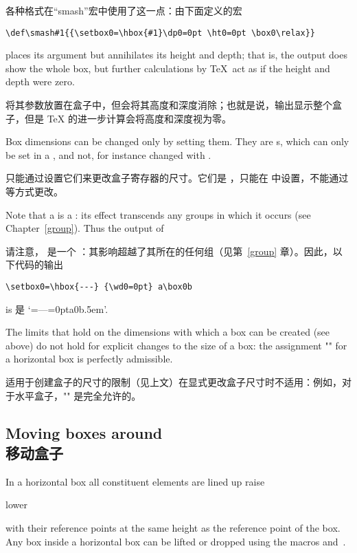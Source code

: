 各种格式在“smash”宏中使用了这一点：由下面定义的宏
\begin{verbatim}
\def\smash#1{{\setbox0=\hbox{#1}\dp0=0pt \ht0=0pt \box0\relax}}
\end{verbatim}
places its argument but annihilates its height and depth;
\altt
that is, the output does show the whole box, but further calculations
by \TeX\ act as if the height and depth were zero.

将其参数放置在盒子中，但会将其高度和深度消除；也就是说，输出显示整个盒子，但是 \TeX{} 的进一步计算会将高度和深度视为零。

Box dimensions can be changed only by setting them.
They are s, which can only be set
in a , and not, for instance
changed with .

只能通过设置它们来更改盒子寄存器的尺寸。它们是 ，只能在  中设置，不能通过  等方式更改。


Note that a  is a :
its effect transcends any groups in which it occurs
(see Chapter~\ref{group}).
Thus the output of 

请注意， 是一个 ：其影响超越了其所在的任何组（见第~\ref{group} 章）。因此，以下代码的输出
\begin{verbatim}
\setbox0=\hbox{---} {\wd0=0pt} a\box0b
\end{verbatim}
is 是 `{=\hbox{---}{=0pt}a\box0b}\kern.5em'.

The limits that hold on the dimensions with which a 
box can be created (see above) do not hold for explicit changes to the
\mdqon
size of a box: the assignment ""\n{-2pt} for a 
\mdqoff
horizontal box is perfectly admissible.

适用于创建盒子的尺寸的限制（见上文）在显式更改盒子尺寸时不适用：例如，对于水平盒子，""\n{-2pt} 是完全允许的。



\subsection{Moving boxes around\\移动盒子}

In a horizontal box all constituent elements are lined up
\cstoidx raise\par\cstoidx lower\par
with their reference points at the same height as the 
reference point of the box. Any box inside a horizontal
box can be lifted or dropped using the macros
 and~.
\awp

